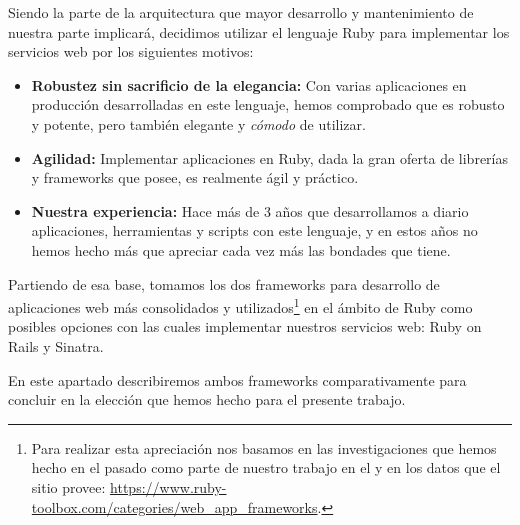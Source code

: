 Siendo la parte de la arquitectura que mayor desarrollo y mantenimiento de nuestra parte implicará, decidimos utilizar el lenguaje Ruby para implementar los servicios web por los siguientes motivos:

\begin{itemize}
  \item \textbf{Robustez sin sacrificio de la elegancia:} Con varias aplicaciones en producción desarrolladas en este lenguaje, hemos comprobado que es robusto y potente, pero también elegante y \textit{cómodo} de utilizar.
  \item \textbf{Agilidad:} Implementar aplicaciones en Ruby, dada la gran oferta de librerías y frameworks que posee, es realmente ágil y práctico.
  \item \textbf{Nuestra experiencia:} Hace más de 3 años que desarrollamos a diario aplicaciones, herramientas y scripts con este lenguaje, y en estos años no hemos hecho más que apreciar cada vez más las bondades que tiene.
\end{itemize}

Partiendo de esa base, tomamos los dos frameworks para desarrollo de aplicaciones web más consolidados y utilizados\footnote{Para realizar esta apreciación nos basamos en las investigaciones que hemos hecho en el pasado como parte de nuestro trabajo en el \cespi y en los datos que el sitio  provee: \url{https://www.ruby-toolbox.com/categories/web_app_frameworks}.} en el ámbito de Ruby como posibles opciones con las cuales implementar nuestros servicios web: Ruby on Rails y Sinatra.

En este apartado describiremos ambos frameworks comparativamente para concluir en la elección que hemos hecho para el presente trabajo.

